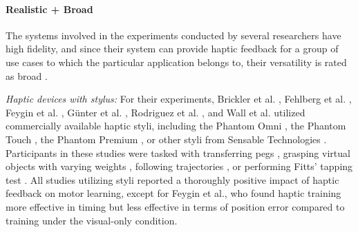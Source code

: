 \paragraph{Realistic + Broad} \label{sec:realisticbroad}
The systems involved in the experiments conducted by several researchers have high fidelity, and since their system can provide haptic feedback for a group of use cases to which the particular application belongs to, their versatility is rated as broad \cite{Brickler2019, Caccianiga2021, Chi2017, Dai2023, Fehlberg2012, Feygin2002HapticSkill, Gambaro2014, Gunter2022, Morris2007, Oquendo2024, Rodriguez2010, Wall2000, Yang2023}.

\textit{Haptic devices with stylus:} For their experiments, Brickler et al. \cite{Brickler2019}, Fehlberg et al. \cite{Fehlberg2012}, Feygin et al. \cite{Feygin2002HapticSkill}, Günter et al. \cite{Gunter2022}, Rodriguez et al. \cite{Rodriguez2010}, and Wall et al. \cite{Wall2000} utilized commercially available haptic styli, including the Phantom Omni \cite{Brickler2019, Fehlberg2012}, the Phantom Touch \cite{Gunter2022}, the Phantom Premium \cite{Rodriguez2010, Wall2000}, or other styli from Sensable Technologies \cite{Feygin2002HapticSkill}. Participants in these studies were tasked with transferring pegs \cite{Brickler2019}, grasping virtual objects with varying weights \cite{Gunter2022}, following trajectories \cite{Fehlberg2012, Feygin2002HapticSkill, Rodriguez2010}, or performing Fitts' tapping test \cite{Wall2000, Fitts1954TheMovement}. All studies utilizing styli reported a thoroughly positive impact of haptic feedback on motor learning, except for Feygin et al., who found haptic training more effective in timing but less effective in terms of position error compared to training under the visual-only condition.

